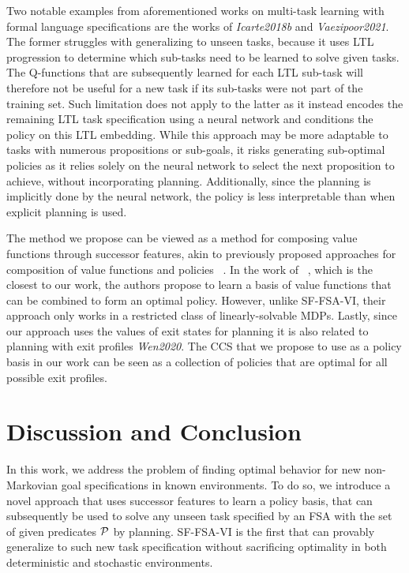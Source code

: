 Two notable examples from aforementioned works on multi-task learning with formal language specifications are the works of \textit{Icarte2018b} and \textit{Vaezipoor2021}. The former struggles with generalizing to unseen tasks, because it uses LTL progression to determine which sub-tasks need to be learned to solve given tasks. The Q-functions that are subsequently learned for each LTL sub-task will therefore not be useful for a new task if its sub-tasks were not part of the training set. Such limitation does not apply to the latter as it instead encodes the remaining LTL task specification using a neural network and conditions the policy on this LTL embedding. While this approach may be more adaptable to tasks with numerous propositions or sub-goals, it risks generating sub-optimal policies as it relies solely on the neural network to select the next proposition to achieve, without incorporating planning. Additionally, since the planning is implicitly done by the neural network, the policy is less interpretable than when explicit planning is used.

The method we propose can be viewed as a method for composing value functions through successor features, akin to previously proposed approaches for composition of value functions and policies ~\citep{Niekerk2019, Barreto2019, NangueTasse2020, Infante2022}. In the work of ~\citep{Infante2022}, which is the closest to our work, the authors propose to learn a basis of value functions that can be combined to form an optimal policy. However, unlike SF-FSA-VI, their approach only works in a restricted class of linearly-solvable MDPs. Lastly, since our approach uses the values of exit states for planning it is also related to planning with exit profiles \textit{Wen2020}. The CCS that we propose to use as a policy basis in our work can be seen as a collection of policies that are optimal for all possible exit profiles.

\section{Discussion and Conclusion}

In this work, we address the problem of finding optimal behavior for new non-Markovian goal specifications in known environments. To do so, we introduce a novel approach that uses successor features to learn a policy basis, that can subsequently be used to solve any unseen task specified by an FSA with the set of given predicates $\mathcal{P}$ by planning. SF-FSA-VI is the first that can provably generalize to such new task specification without sacrificing optimality in both deterministic and stochastic environments.

